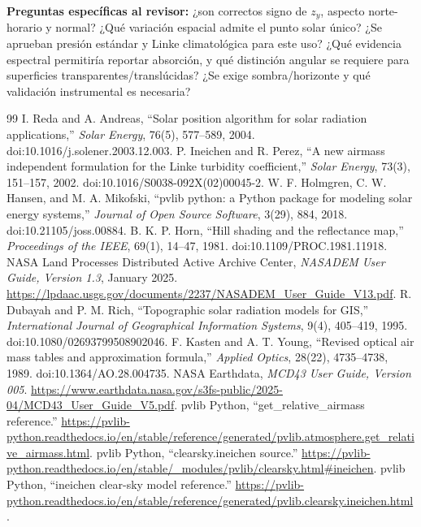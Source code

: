 \documentclass[11pt,a4paper]{article}
\begin{document}
\noindent\textbf{Preguntas específicas al revisor:} ¿son correctos signo de $z_y$, aspecto norte-horario y normal? ¿Qué variación espacial admite el punto solar único? ¿Se aprueban presión estándar y Linke climatológica para este uso? ¿Qué evidencia espectral permitiría reportar absorción, y qué distinción angular se requiere para superficies transparentes/translúcidas? ¿Se exige sombra/horizonte y qué validación instrumental es necesaria?

\begin{thebibliography}{99}
 I. Reda and A. Andreas, ``Solar position algorithm for solar radiation applications,'' \emph{Solar Energy}, 76(5), 577--589, 2004. doi:10.1016/j.solener.2003.12.003.
 P. Ineichen and R. Perez, ``A new airmass independent formulation for the Linke turbidity coefficient,'' \emph{Solar Energy}, 73(3), 151--157, 2002. doi:10.1016/S0038-092X(02)00045-2.
 W. F. Holmgren, C. W. Hansen, and M. A. Mikofski, ``pvlib python: a Python package for modeling solar energy systems,'' \emph{Journal of Open Source Software}, 3(29), 884, 2018. doi:10.21105/joss.00884.
 B. K. P. Horn, ``Hill shading and the reflectance map,'' \emph{Proceedings of the IEEE}, 69(1), 14--47, 1981. doi:10.1109/PROC.1981.11918.
 NASA Land Processes Distributed Active Archive Center, \emph{NASADEM User Guide, Version 1.3}, January 2025. \url{https://lpdaac.usgs.gov/documents/2237/NASADEM_User_Guide_V13.pdf}.
 R. Dubayah and P. M. Rich, ``Topographic solar radiation models for GIS,'' \emph{International Journal of Geographical Information Systems}, 9(4), 405--419, 1995. doi:10.1080/02693799508902046.
 F. Kasten and A. T. Young, ``Revised optical air mass tables and approximation formula,'' \emph{Applied Optics}, 28(22), 4735--4738, 1989. doi:10.1364/AO.28.004735.
 NASA Earthdata, \emph{MCD43 User Guide, Version 005}. \url{https://www.earthdata.nasa.gov/s3fs-public/2025-04/MCD43_User_Guide_V5.pdf}.
 pvlib Python, ``get\_relative\_airmass reference.'' \url{https://pvlib-python.readthedocs.io/en/stable/reference/generated/pvlib.atmosphere.get_relative_airmass.html}.
 pvlib Python, ``clearsky.ineichen source.'' \url{https://pvlib-python.readthedocs.io/en/stable/_modules/pvlib/clearsky.html#ineichen}.
 pvlib Python, ``ineichen clear-sky model reference.'' \url{https://pvlib-python.readthedocs.io/en/stable/reference/generated/pvlib.clearsky.ineichen.html}.

\end{thebibliography}
\end{document}
